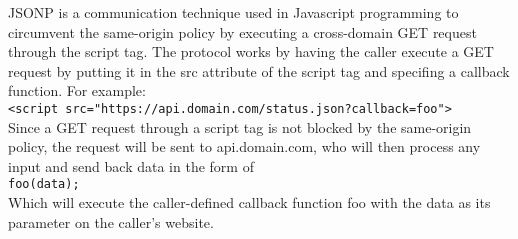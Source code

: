 \documentclass[addpoints,answers]{exam}
\begin{document}
\begin{questions}

\pagebreak


JSONP is a communication technique used in Javascript programming to
circumvent the same-origin policy by executing a cross-domain GET
request through the script tag.  The protocol works by having the
caller execute a GET request by putting it in the src attribute of the
script tag and specifing a callback function.  For example: \\

\texttt{<script src="https://api.domain.com/status.json?callback=foo">}\\

Since a GET request through a script tag is not blocked by the
same-origin policy, the request will be sent to api.domain.com, who
will then process any input and send back data in the form of\\

\texttt{foo(data);}\\

Which will execute the caller-defined callback function foo with the data as its parameter on the caller's website.


\end{questions}
\end{document}
